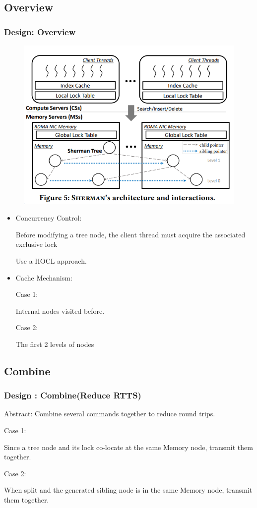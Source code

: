 \documentclass[11pt]{beamer}                                                                                                   %
\begin{document}
\subsection{Overview}
\begin{frame}[t]
	\frametitle{Design: Overview}
\begin{figure}
	\centering
	\includegraphics[width=0.7\linewidth]{15}

\end{figure}

\end{frame}
\begin{frame}[t]
	\begin{itemize}
		
	\item Concurrency Control:
	
	Before modifying a tree node, the
	client thread must acquire the associated exclusive lock
	
	
	Use a HOCL approach.
	
	
	\item Cache Mechanism: 
	
	
	Case 1:
	
	
	Internal nodes visited before.  
	
	
	
	Case 2:
	
	
	The first 2 levels of nodes
	
	

	
	
\end{itemize}  

	
\end{frame}
\subsection{Combine}
\begin{frame}[fragile]
	\frametitle{Design : Combine(Reduce RTTS)}
	Abstract: Combine several commands together to reduce round trips.
	
	Case 1:
	
	
		Since a tree node and its lock co-locate at the same Memory node, transmit them together.
		
		
	Case 2:
	
		
		When split and the generated sibling node is in the same Memory node, transmit them together.
\end{frame}
\end{document}
